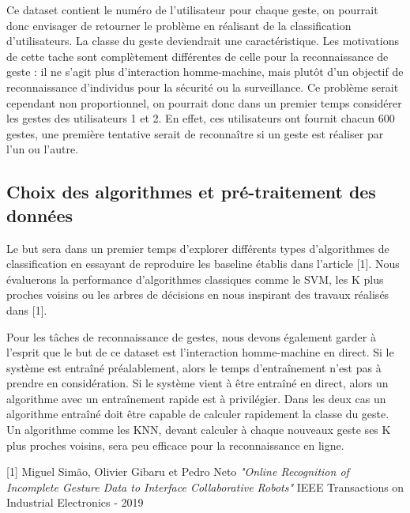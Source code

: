 \documentclass[12pt,a4paper,roman]{article}
\begin{document}
Ce dataset contient le numéro de l'utilisateur pour chaque geste, on pourrait donc envisager de retourner le problème en réalisant de la classification d'utilisateurs. La classe du geste deviendrait une caractéristique. Les motivations de cette tache sont complètement différentes de celle pour la reconnaissance de geste : il ne s'agit plus d'interaction homme-machine, mais plutôt d'un objectif de reconnaissance d'individus pour la sécurité ou la surveillance. Ce problème serait cependant non proportionnel, on pourrait donc dans un premier temps considérer les gestes des utilisateurs 1 et 2. En effet, ces utilisateurs ont fournit chacun 600 gestes, une première tentative serait de reconnaître si un geste est réaliser par l'un ou l'autre.

\subsection{Choix des algorithmes et pré-traitement des données}
Le but sera dans un premier temps d'explorer différents types d'algorithmes de classification en essayant de reproduire les baseline établis dans l'article [1]. Nous évaluerons la performance d'algorithmes classiques comme le SVM, les K plus proches voisins ou les arbres de décisions en nous inspirant des travaux réalisés dans [1]. 
\newpage

Pour les tâches de reconnaissance de gestes, nous devons également garder à l'esprit que le but de ce dataset est l'interaction homme-machine en direct. Si le système est entraîné préalablement, alors le temps d'entraînement n'est pas à prendre en considération. Si le système vient à être entraîné en direct, alors un algorithme avec un entraînement rapide est à privilégier. Dans les deux cas un algorithme entraîné doit être capable de calculer rapidement la classe du geste. Un algorithme comme les KNN, devant calculer à chaque nouveaux geste ses K plus proches voisins, sera peu efficace pour la reconnaissance en ligne.










[1] Miguel Simão, Olivier Gibaru et Pedro Neto \textit{"Online Recognition of Incomplete Gesture Data to Interface Collaborative Robots"} IEEE Transactions on Industrial Electronics - 2019
\end{document}
